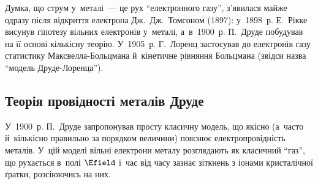 
\begin{Historical}
	Думка, що струм у~металі~--- це рух \enquote{електронного газу}, з'явилася майже
	одразу після відкриття електрона Дж.~Дж.~Томсоном (1897): у~1898~р. Е.~Рікке висунув
	гіпотезу вільних електронів у~металі, а~в~1900~р. П.~Друде побудував на її основі
	кількісну теорію. У~1905~р. Г.~Лоренц застосував до електронів газу статистику
	Максвелла-Больцмана й~кінетичне рівняння Больцмана (звідси назва \enquote{модель
	Друде-Лоренца}).
\end{Historical}


\subsection*{Теорія провідності металів Друде}


У~1900~р. П.~Друде запропонував просту класичну модель, що якісно (а~часто й~кількісно
правильно за порядком величини) пояснює електропровідність металів. У~цій моделі вільні
електрони металу розглядають як класичний \enquote{газ}, що рухається в~полі $\Efield$
і~час від часу зазнає зіткнень з іонами кристалічної ґратки, розсіюючись на них.


